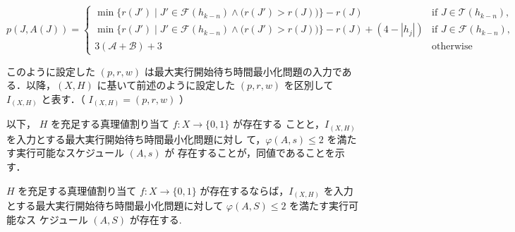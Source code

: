 \documentclass[12pt]{optlab-bachelor}
\begin{document}
{\small
$$p(J,A(J)) = \left\{ \begin{array}{lll} \min \big\{r(J') \mid
J' \in \mathcal{F}(h_{k - n}) \wedge \big(r(J') > r(J) \big) \big\} - r(J)
& \text{if } J \in \mathcal{T}(h_{k - n}), \\ \min \big\{r(J') \mid
J' \in \mathcal{F}(h_{k - n}) \wedge \big(r(J') > r(J) \big) \big\} - r(J)
+ (4 - |h_j|) & \text{if } J \in \mathcal{F}(h_{k - n}), \\ 3(\mathcal{A} + \mathcal{B}) + 3 & \text{otherwise}\end{array} \right.$$
}

このように設定した $(p,r,w)$ は最大実行開始待ち時間最小化問題の入力である．以降，$(X,H)$ に基いて前述のように設定した $(p,r,w)$ を区別して $I_{(X,H)}$ と表す．（ $I_{(X,H)} = (p,r,w)$ ）

以下， $H$ を充足する真理値割り当て $f : X \to \{0,1\}$ が存在する
ことと，$I_{(X,H)}$ を入力とする最大実行開始待ち時間最小化問題に対し
て，$\varphi(A,s) \le 2$ を満たす実行可能なスケジュール $(A,s)$ が
存在することが，同値であることを示す．

\begin{lemma}\label{l_5}
  $H$ を充足する真理値割り当て $f : X \to \{0,1\}$ が存在するならば，$I_{(X,H)}$ を入力とする最大実行開始待ち時間最小化問題に対して
  $\varphi(A, S) \le 2$ を満たす実行可能なス
  ケジュール $(A, S)$ が存在する.
\end{lemma}
\end{document}
